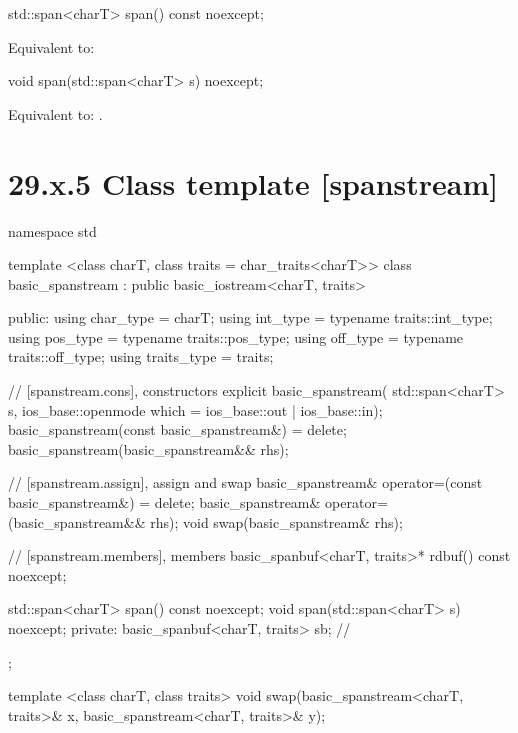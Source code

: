 \documentclass[ebook,11pt,article]{memoir}
\renewcommand{\iref}[1]{[#1]}
\begin{document}
\begin{itemdecl}
std::span<charT> span() const noexcept;
\end{itemdecl}

\begin{itemdescr}
\pnum
\effects Equivalent to: \\
\end{itemdescr}

\begin{itemdecl}
void span(std::span<charT> s) noexcept;
\end{itemdecl}

\begin{itemdescr}
\pnum
\effects
Equivalent to:
.
\end{itemdescr}

\section{29.x.5 Class template  [spanstream] }

\begin{codeblock}
namespace std {
  template <class charT, class traits = char_traits<charT>>
  class basic_spanstream
    : public basic_iostream<charT, traits> {
  public:
    using char_type      = charT;
    using int_type       = typename traits::int_type;
    using pos_type       = typename traits::pos_type;
    using off_type       = typename traits::off_type;
    using traits_type    = traits;

    // \iref{spanstream.cons}, constructors
    explicit basic_spanstream(
      std::span<charT> s,
      ios_base::openmode which = ios_base::out | ios_base::in);
    basic_spanstream(const basic_spanstream&) = delete;
    basic_spanstream(basic_spanstream&& rhs);

    // \iref{spanstream.assign}, assign and swap
    basic_spanstream& operator=(const basic_spanstream&) = delete;
    basic_spanstream& operator=(basic_spanstream&& rhs);
    void swap(basic_spanstream& rhs);

    // \iref{spanstream.members}, members
    basic_spanbuf<charT, traits>* rdbuf() const noexcept;

    std::span<charT> span() const noexcept;
    void span(std::span<charT> s) noexcept;
  private:
    basic_spanbuf<charT, traits> sb; // \expos
  };

  template <class charT, class traits>
    void swap(basic_spanstream<charT, traits>& x,
              basic_spanstream<charT, traits>& y);
}
\end{codeblock}
\end{document}
